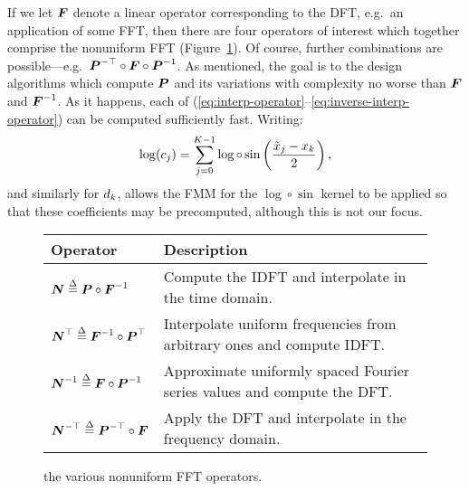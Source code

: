 If we let $\boldsymbol{F}$ denote a linear operator corresponding to the DFT,
e.g.\ an application of some FFT, then there are four operators of
interest which together comprise the nonuniform FFT
(Figure~\ref{fig:operators}).  Of course, further combinations are
possible---e.g.\ $\boldsymbol{P}^{-\top}\circ\boldsymbol{F}\circ\boldsymbol{P}^{-1}$. As
mentioned, the goal is to the design algorithms which compute
$\boldsymbol{P}$ and its variations with complexity no worse than $\boldsymbol{F}$
and $\boldsymbol{F}^{-1}$. As it happens, each of
(\ref{eq:interp-operator}--\ref{eq:inverse-interp-operator}) can be
computed sufficiently fast. Writing:
\begin{align}
  \label{eq:log-sin}
  \log(c_{j}) = \sum_{j=0}^{K-1} \log\circ\sin\left(\frac{{\tilde{x}}_{j}-{x}_{k}}{2}\right),
\end{align}
and similarly for $d_{k}$, allows the FMM for the
$\log\circ\sin$ kernel to be applied so that these coefficients may be
precomputed, although this is not our focus.

\begin{figure}[h]
  \centering
  \begin{tabular}[h]{ll}
    Operator & Description \\
    \midrule
    $\boldsymbol{N} \overset{\Delta}{=} \boldsymbol{P}\circ\boldsymbol{F}^{-1}$ & Compute the IDFT and interpolate in the time domain. \\
    $\boldsymbol{N}^\top \overset{\Delta}{=} \boldsymbol{F}^{-1}\circ\boldsymbol{P}^\top$ & Interpolate uniform frequencies from arbitrary ones and compute IDFT.\@ \\
    $\boldsymbol{N}^{-1} \overset{\Delta}{=} \boldsymbol{F}\circ\boldsymbol{P}^{-1}$ & Approximate uniformly spaced Fourier series values and compute the DFT.\@ \\
    $\boldsymbol{N}^{-\top} \overset{\Delta}{=} \boldsymbol{P}^{-\top}\circ\boldsymbol{F}$ & Apply the DFT and interpolate in the frequency domain. \\
  \end{tabular}
  \caption{the various nonuniform FFT operators.}\label{fig:operators}
\end{figure}

